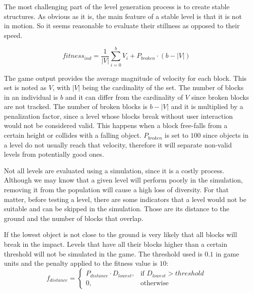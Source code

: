 \documentclass[runningheads,a4paper]{llncs}
\begin{document}

The most challenging part of the level generation process is to create stable 
structures. As obvious as it is, the main feature of a stable level is that it 
is not in motion. So it seems reasonable to evaluate their stillness as opposed 
to their speed.

$$fitness_{ind} = \frac{1}{|V|}\sum_{i=0}^{b}{V_i} + P_{broken}\cdot(b-|V|)$$

The game output provides the average magnitude of velocity for each block. This 
set is noted as $V$, with $|V|$ being the cardinality of the set. The number of 
blocks in an individual is $b$ and it can differ from the cardinality of $V$ 
since broken blocks are not tracked. The number of broken blocks is $b-|V|$ and 
it is multiplied by a penalization factor, since a level whose blocks break 
without user interaction would not be considered valid. This happens when a 
block free-falls from a certain height or collides with a falling object. 
$P_{broken}$ is set to $100$ since objects in a level do not usually reach that 
velocity, therefore it will separate non-valid levels from potentially good 
ones.



Not all levels are evaluated using a simulation, since it is a costly process. 
Although we may know that a given level will perform poorly in the simulation, 
removing it from the population will cause a high loss of diversity. For that 
matter, before testing a level, there are some indicators that a level would 
not be suitable and can be skipped in the simulation. Those are its distance to 
the ground and the number of blocks that overlap.

If the lowest object is not close to the ground is very likely that all blocks 
will break in the impact. Levels that have all their blocks higher than a 
certain threshold will not be simulated in the game. The threshold used is 
$0.1$ in game units and the penalty applied to the fitness value is $10$:
$$f_{distance} = 
\begin{cases}
P_{distance}\cdot D_{lowest}, & \text{if } D_{lowest} > threshold\\
0, & \text{otherwise}
\end{cases}
$$
\end{document}

